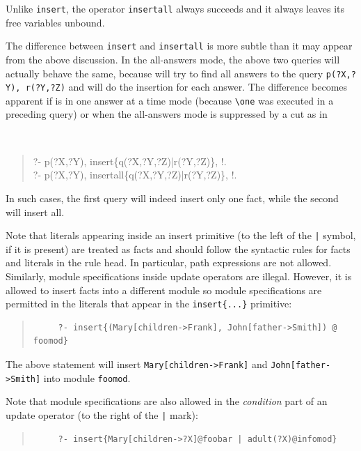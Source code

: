 \documentclass[11pt]{article}
\newcommand{\ERGO}{\mbox{\smaller{\ensuremath{\cal{E}}\smaller{{\sc{RGO}}}}}\xspace}
\newcommand{\FLSYSTEM}{\ERGO}
\newcommand{\bs}{\textbackslash}
\begin{document}
Unlike {\tt insert}, the operator {\tt insertall} always succeeds and it
always leaves its free variables unbound.

The difference between {\tt insert} and {\tt insertall} is more subtle than
it may appear from the above discussion. In the all-answers mode, the above
two queries will actually behave the same, because \FLSYSTEM will try to find
all answers to the query {\tt p(?X,?Y), r(?Y,?Z)} and will do the 
insertion for each answer. The difference becomes apparent if \FLSYSTEM is in
one answer at a time mode (because {\tt \bs{}one} was executed in a preceding
query) or when the all-answers mode is suppressed by a cut as in
{\tt
\begin{quote}
       ?- p(?X,?Y), insert\{q(?X,?Y,?Z)|r(?Y,?Z)\}, !.\\ 
       ?- p(?X,?Y), insertall\{q(?X,?Y,?Z)|r(?Y,?Z)\}, !.
\end{quote}
}
\noindent
In such cases, the first query will indeed insert only one fact, while the
second will insert all.

Note that literals appearing inside an insert primitive (to the left of the
\verb'|' symbol, if it is present) are treated as
facts and should follow the syntactic rules for facts and literals in the
rule head. In particular, path expressions are not allowed.
Similarly, module specifications inside update operators are illegal.
However, it is allowed to insert facts into a different module so module
specifications are permitted in the literals that appear in the 
{\tt insert\{...\}} primitive:
\begin{quote}
\begin{verbatim}
     ?- insert{(Mary[children->Frank], John[father->Smith]) @ foomod}
\end{verbatim}
\end{quote}
The above statement will insert {\tt Mary[children->Frank]} and
{\tt John[father->Smith]} into module {\tt foomod}.

Note that module specifications are also allowed in the
\emph{condition} part of an update operator (to the right of the \verb'|'
mark):
\begin{quote}
\begin{verbatim}
     ?- insert{Mary[children->?X]@foobar | adult(?X)@infomod}
\end{verbatim}
\end{quote}
\end{document}
